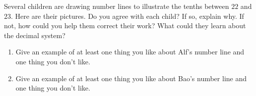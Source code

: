 \documentclass[nooutcomes,noauthor,handout]{ximera}
\begin{document}
\begin{problem}
 Several children are drawing number lines to illustrate the tenths between $22$ and $23$. Here are their pictures. Do you agree with each child?  If so, explain why.  If not, how could you help them correct their work?  What could they learn about the decimal system?

\begin {image}
\end{image}

\begin{enumerate}
	\item Give an example of at least one thing you like about Alf's number line and one thing you don't like.
	\item Give an example of at least one thing you like about Bao's number line and one thing you don't like.
\end{enumerate}
\end{problem}
\end{document}
